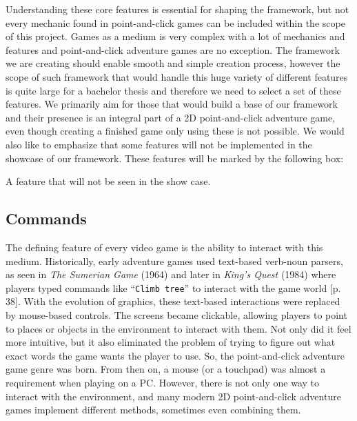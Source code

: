 Understanding these core features is essential for shaping the framework, but not every mechanic found in point-and-click games can be included within the scope of this project. Games as a medium is very complex with a lot of mechanics and features and point-and-click adventure games are no exception. The framework we are creating should enable smooth and simple creation process, however the scope of such framework that would handle this huge variety of different features is quite large for a bachelor thesis and therefore we need to select a set of these features. We primarily aim for those that would build a base of our framework and their presence is an integral part of a 2D point-and-click adventure game, even though creating a finished game only using these is not possible. We would also like to emphasize that some features will not be implemented in the showcase of our framework. These features will be marked by the following box:


\begin{notImplemented}
 \par
\vspace{3mm}
A feature that will not be seen in the show case.
\end{notImplemented}

\subsection{Commands}
\label{sec:Commands}
The defining feature of every video game is the ability to interact with this medium. Historically, early adventure games used text-based verb-noun parsers, as seen in \textit{The Sumerian Game} (1964) and later in \textit{King's Quest} (1984) where players typed commands like “\texttt{Climb tree}” to interact with the game world \cite{Salter2014}[p. 38]. With the evolution of graphics, these text-based interactions were replaced by mouse-based controls. The screens
became clickable, allowing players to point to places or objects in the environment to interact with them.  Not only did it feel more intuitive, but it also eliminated the problem of trying to figure out what exact words the game wants the player to use. So, the point-and-click adventure game genre was born. From then on, a mouse (or a touchpad) was almost a requirement when playing on a PC. However, there is not only one way to interact with the environment, and many modern 2D point-and-click adventure games implement different methods, sometimes even combining them.

